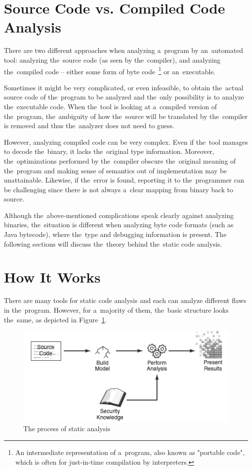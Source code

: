 \documentclass[
  digital, %
  table,   %
  lof,     %
  lot,     %
  oneside,
]{fithesis3}
\begin{document}
\section{Source Code vs. Compiled Code Analysis}
There are two different approaches when analyzing a~program by an~automated tool: analyzing the~source code (as seen by the~compiler), and analyzing the~compiled code -- either some form of byte code~\footnote{An intermediate representation of a~program, also known as "portable code", which is often for just-in-time compilation by interpreters.} or an~executable.

Sometimes it might be very complicated, or even infeasible, to obtain the~actual source code of the~program to be analyzed and the~only possibility is to analyze the~executable code. When the~tool is looking at a~compiled version of the~program, the~ambiguity of how the~source will be translated by the~compiler is removed and thus the~analyzer does not need to guess. 

However, analyzing compiled code can be very complex. Even if the~tool manages to decode the~binary, it lacks the~original type information. Moreover, the~optimizations performed by the~compiler obscure the~original meaning of the~program and making sense of semantics out of implementation may be unattainable. Likewise, if the~error is found, reporting it to the~programmer can be challenging since there is not always a~clear mapping from binary back to source. 

Although the~above-mentioned complications speak clearly against analyzing binaries, the~situation is different when analyzing byte code formats (such as Java bytecode), where the~type and debugging information is present. The following sections will discuss the~theory behind the~static code analysis.

\section{How It Works}
There are many tools for static code analysis and each can analyze different flaws in the~program. However, for a~majority of them, the~basic structure looks the~same, as depicted in Figure~\ref{fig:static-code-analysis-internals}.

\begin{figure}[h!]
		\centering
			\includegraphics[scale=0.75]{img/static-code-analysis-internals}
		\caption{The process of static analysis~\cite{secure-programming-sca}}
		\label{fig:static-code-analysis-internals}
\end{figure}
\end{document}
